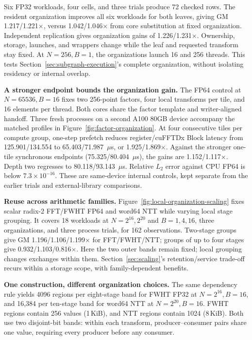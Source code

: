 Six FP32 workloads, four cells, and three trials produce 72 checked rows.
The resident organization improves all six workloads
for both leaves, giving GM 1.217/1.221$\times$, versus 1.042/1.046$\times$
from core substitution at fixed organization. Independent replication gives
organization gains of 1.226/1.231$\times$.
Ownership, storage, launches, and wrappers change while the leaf and requested
transform stay fixed. At $N=256,B=1$, the organizations launch 16 and 256
threads. This tests Section~\ref{sec:subgraph-execution}'s complete organization,
without isolating residency or internal overlap.

\textbf{A stronger endpoint bounds the organization gain.}
The FP64 control at $N=65536,B=16$ fixes two 256-point factors, four local
transforms per tile, and 16 elements per thread. Both cores share
the factor template and writer-aligned handoff.
Three fresh processes on a second A100 80GB device accompany the matched
profiles in Figure~\ref{fig:factor-organization}. At four consecutive tiles per
compute group, one-step prefetch reduces register/cuFFTDx Block latency
from 125.901/134.554 to 65.403/71.987~$\mu$s, or 1.925/1.869$\times$.
Against the stronger one-tile synchronous endpoints (75.325/80.404~$\mu$s),
the gains are 1.152/1.117$\times$. Depth two regresses to
80.118/93.143~$\mu$s. Relative $L_2$ error against CPU FP64 is below
$7.3\times10^{-16}$. These are same-device internal controls, kept separate
from the earlier trials and external-library comparisons.

\textbf{Reuse across arithmetic families.}
Figure~\ref{fig:local-organization-scaling} fixes scalar radix-2 FFT/FWHT
FP64 and word64 NTT while varying local stage grouping. It covers 18 workloads
at $N=2^{16},2^{20}$ and $B=1,4,16$, three organizations, and three process
trials, for 162 observations. Two-stage groups give GM 1.196/1.106/1.199$\times$
for FFT/FWHT/NTT; groups of up to four stages give
0.932/1.103/0.816$\times$. Here the two outer bands remain fixed; local grouping
changes exchanges within them. Section~\ref{sec:scaling}'s retention/service
trade-off recurs within a storage scope, with family-dependent benefits.

\textbf{One construction, different organization choices.}
\label{sec:decision-walkthrough}
The same dependency rule yields 4096 regions per eight-stage band for
FWHT FP32 at $N=2^{16},B=16$, and 16,384 per ten-stage band for word64
NTT at $N=2^{20},B=16$. FWHT regions contain 256 values (1\,KiB),
and NTT regions contain 1024 (8\,KiB).
Both use two disjoint-bit bands: within each transform, producer--consumer
pairs share one value, requiring every producer before any consumer.

